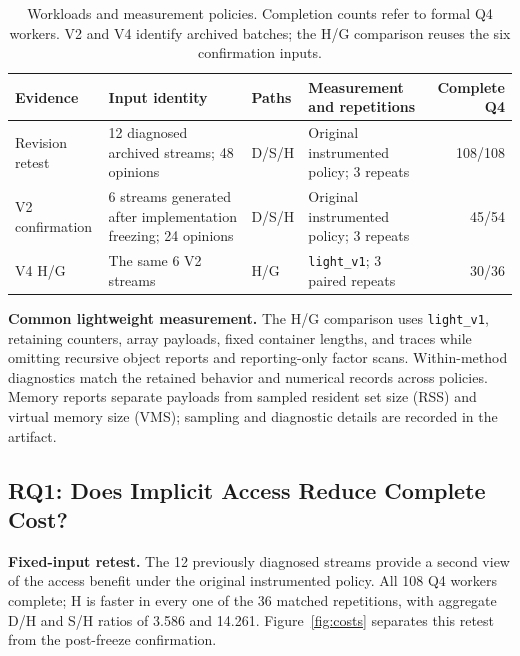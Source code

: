 \begin{table}[t]
\centering
\caption{Workloads and measurement policies. Completion counts refer to formal Q4 workers. V2 and V4 identify archived batches; the H/G comparison reuses the six confirmation inputs.}
\label{tab:evidence_scope}
\begin{tabularx}{\textwidth}{@{}lYlYr@{}}
\toprule
Evidence & Input identity & Paths & Measurement and repetitions & Complete Q4\\
\midrule
Revision retest & 12 diagnosed archived streams; 48 opinions & D/S/H & Original instrumented policy; 3 repeats & 108/108\\
V2 confirmation & 6 streams generated after implementation freezing; 24 opinions & D/S/H & Original instrumented policy; 3 repeats & 45/54\\
V4 H/G & The same 6 V2 streams & H/G & \texttt{light\_v1}; 3 paired repeats & 30/36\\
\bottomrule
\end{tabularx}
\end{table}

\textbf{Common lightweight measurement.} The H/G comparison uses \texttt{light\_v1}, retaining counters, array payloads, fixed container lengths, and traces while omitting recursive object reports and reporting-only factor scans. Within-method diagnostics match the retained behavior and numerical records across policies. Memory reports separate payloads from sampled resident set size (RSS) and virtual memory size (VMS); sampling and diagnostic details are recorded in the artifact.

\subsection{RQ1: Does Implicit Access Reduce Complete Cost?}


\textbf{Fixed-input retest.} The 12 previously diagnosed streams provide a second view of the access benefit under the original instrumented policy. All 108 Q4 workers complete; H is faster in every one of the 36 matched repetitions, with aggregate D/H and S/H ratios of 3.586 and 14.261. Figure~\ref{fig:costs} separates this retest from the post-freeze confirmation.

